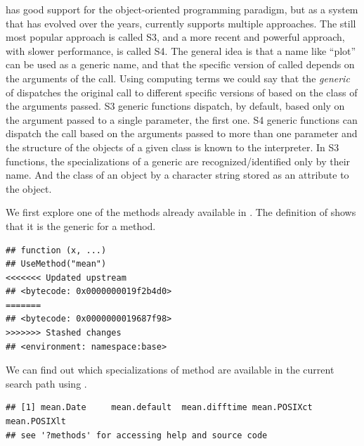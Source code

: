 \documentclass[krantz2]{krantz}\usepackage{knitr}
\begin{document}
\Rlang has good support for the object-oriented programming paradigm, but as a system that has evolved over the years, currently \Rlang supports multiple approaches. The still most popular approach is called S3, and a more recent and powerful approach, with slower performance, is called S4. The general idea is that a name like ``plot'' can be used as a generic name, and that the specific version of  called depends on the arguments of the call. Using computing terms we could say that the \emph{generic} of  dispatches the original call to different specific versions of  based on the class of the arguments passed. S3 generic functions dispatch, by default, based only on the argument passed to a single parameter, the first one. S4 generic functions can dispatch the call based on the arguments passed to more than one parameter and the structure of the objects of a given class is known to the interpreter. In S3 functions, the specializations of a generic are recognized/identified only by their name. And the class of an object by a character string stored as an attribute to the object.

We first explore one of the methods already available in \Rlang. The definition of  shows that it is the generic for a method.

\begin{knitrout}\footnotesize
{}\color{fgcolor}\begin{kframe}
\begin{alltt}
\end{alltt}
\begin{verbatim}
## function (x, ...) 
## UseMethod("mean")
<<<<<<< Updated upstream
## <bytecode: 0x0000000019f2b4d0>
=======
## <bytecode: 0x0000000019687f98>
>>>>>>> Stashed changes
## <environment: namespace:base>
\end{verbatim}
\end{kframe}
\end{knitrout}

We can find out which specializations of method are available in the current search path using .

\begin{knitrout}\footnotesize
{}\color{fgcolor}\begin{kframe}
\begin{alltt}
\end{alltt}
\begin{verbatim}
## [1] mean.Date     mean.default  mean.difftime mean.POSIXct  mean.POSIXlt 
## see '?methods' for accessing help and source code
\end{verbatim}
\end{kframe}
\end{knitrout}
\end{document}
